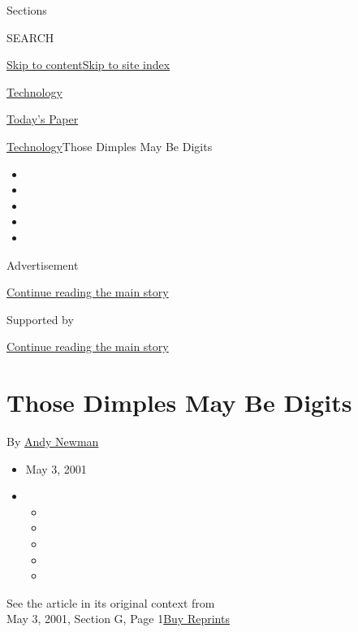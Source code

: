 Sections

SEARCH

\protect\hyperlink{site-content}{Skip to
content}\protect\hyperlink{site-index}{Skip to site index}

\href{https://www.nytimes3xbfgragh.onion/section/technology}{Technology}

\href{https://myaccount.nytimes3xbfgragh.onion/auth/login?response_type=cookie\&client_id=vi}{}

\href{https://www.nytimes3xbfgragh.onion/section/todayspaper}{Today's
Paper}

\href{/section/technology}{Technology}\textbar{}Those Dimples May Be
Digits

\begin{itemize}
\item
\item
\item
\item
\item
\end{itemize}

Advertisement

\protect\hyperlink{after-top}{Continue reading the main story}

Supported by

\protect\hyperlink{after-sponsor}{Continue reading the main story}

\hypertarget{those-dimples-may-be-digits}{%
\section{Those Dimples May Be
Digits}\label{those-dimples-may-be-digits}}

By \href{https://www.nytimes3xbfgragh.onion/by/andy-newman}{Andy Newman}

\begin{itemize}
\item
  May 3, 2001
\item
  \begin{itemize}
  \item
  \item
  \item
  \item
  \item
  \end{itemize}
\end{itemize}

See the article in its original context from\\
May 3, 2001, Section G, Page
1\href{https://store.nytimes3xbfgragh.onion/collections/new-york-times-page-reprints?utm_source=nytimes\&utm_medium=article-page\&utm_campaign=reprints}{Buy
Reprints}

